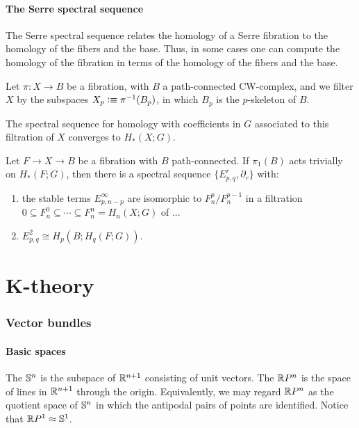 \documentclass{article}
\begin{document}
\subsection{The Serre spectral sequence}

The Serre spectral sequence relates the homology of a Serre fibration to the
homology of the fibers and the base. Thus, in some cases one can compute the
homology of the fibration in terms of the homology of the fibers and the base.

Let $\pi : X\to B$ be a fibration, with $B$ a path-connected CW-complex, and we
filter $X$ by the subspaces $X_p\vcentcolon\equiv \pi^{-1}(B_p)$, in which $B_p$ is the
$p$-skeleton of $B$. 

\begin{lem}
The spectral sequence for homology with coefficients in $G$ associated to this
filtration of $X$ converges to $H_\ast(X;G)$.
\end{lem}

\begin{thm}
Let $F\to X\to B$ be a fibration with $B$ path-connected. If $\pi_1(B)$ acts
trivially on $H_\ast(F;G)$, then there is a spectral sequence $\{E^r_{p,q},\partial_r\}$
with:
\begin{enumerate}
\item the stable terms $E^\infty_{p,n-p}$ are isomorphic to $F^p_n/F^{p-1}_n$ in
a filtration $0\subseteq F^0_n\subseteq\cdots\subseteq F^n_n=H_n(X;G)$ of ...
\item $E^2_{p,q}\cong H_p(B;H_q(F;G))$. 
\end{enumerate}
\end{thm}

\part{K-theory}

\section{Vector bundles}

\subsection{Basic spaces}
\begin{defn}
The  $\mathbb{S}^n$ is the subspace of $\mathbb{R}^{n+1}$ consisting of unit vectors.
The  $\mathbb{R} P^n$  is the space of lines in
$\mathbb{R}^{n+1}$ through the origin. Equivalently, we may regard $\mathbb{R} P^n$ as the quotient
space of $\mathbb{S}^n$ in which the antipodal pairs of points are identified. Notice
that $\mathbb{R} P^1\approx \mathbb{S}^1$. 
\end{defn}
\end{document}

